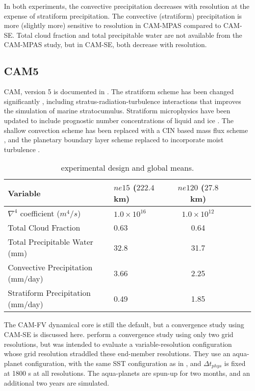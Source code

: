In both experiments, the convective precipitation decreases with resolution at the expense of stratiform precipitation. The convective (stratiform) precipitation is more (slightly more) sensitive to resolution in CAM-MPAS compared to CAM-SE. Total cloud fraction and total precipitable water are not available from the CAM-MPAS study, but in CAM-SE, both decrease with resolution.

\subsection{CAM5}

CAM, version 5 is documented in \citep{CAM5}. The stratiform scheme has been changed significantly \citep{PETAL2014JCLIM}, including stratus-radiation-turbulence interactions that improves the simulation of marine stratocumulus. Stratiform microphysics have been updated to include prognostic number concentrations of liquid and ice \citep{MG2008JC}. The shallow convection scheme has been replaced with a CIN based mass flux scheme \citep{PB2009JC}, and the planetary boundary layer scheme replaced to incorporate moist turbulence \citep{BC2009JCLIM}.

 \begin{table}
 \caption{\cite{ZetAl2014JCb} experimental design and global means.}
 \centering
 \scriptsize
 \begin{tabular}{llcccc}
 \hline
Variable & $ne15$ ($222.4$ km) & $ne120$ ($27.8$ km)\\
 \hline
   $\nabla^{4}$ coefficient ($m^4/s$) & $1.0 \times 10^{16}$ & $1.0 \times 10^{12}$ \\
   Total Cloud Fraction & 0.63 & 0.64 \\
   Total Precipitable Water (mm) & 32.8 & 31.7 \\
   Convective Precipitation (mm/day) & 3.66 & 2.25 \\
   Stratiform Precipitation (mm/day) & 0.49 & 1.85 \\
 \hline
 \end{tabular}
 \label{tbl:table1-5}
 \end{table}

The CAM-FV dynamical core is still the default, but a convergence study using CAM-SE is discussed here. \cite{ZetAl2014JCb} perform a convergence study using only two grid resolutions, but was intended to evaluate a variable-resolution configuration whose grid resolution straddled these end-member resolutions. They use an aqua-planet configuration, with the same SST configuration as in \cite{W2008TELLUS} \citep[`CONTROL' in][]{NH2000ASL}, and $\Delta t_{phys}$ is fixed at 1800 s at all resolutions. The aqua-planets are spun-up for two months, and an additional two years are simulated.

